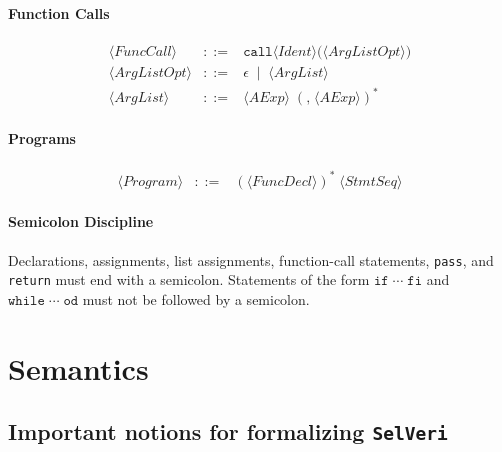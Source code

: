 \documentclass{article}
\begin{document}
\paragraph{Function Calls}
\[
\begin{array}{rcl}
\langle \mathit{FuncCall} \rangle
&::=&
\mathtt{call} \langle \mathit{Ident} \rangle\texttt{(}\langle \mathit{ArgListOpt} \rangle\texttt{)} \\[4pt]

\langle \mathit{ArgListOpt} \rangle
&::=&
\epsilon
\;\mid\;
\langle \mathit{ArgList} \rangle \\[4pt]

\langle \mathit{ArgList} \rangle
&::=&
\langle \mathit{AExp} \rangle\;(\texttt{,}\;\langle \mathit{AExp} \rangle)^*
\end{array}
\]

\paragraph{Programs}
\[
\begin{array}{rcl}
\langle \mathit{Program} \rangle
&::=&
(\langle \mathit{FuncDecl} \rangle)^*\;\langle \mathit{StmtSeq} \rangle
\end{array}
\]

\paragraph{Semicolon Discipline}
Declarations, assignments, list assignments, function-call statements, \texttt{pass}, and \texttt{return}
must end with a semicolon. Statements of the form
\(\mathtt{if}\;\cdots\;\mathtt{fi}\) and
\(\mathtt{while}\;\cdots\;\mathtt{od}\) must not be followed by a semicolon.



\newpage
\section{Semantics}
\vspace{2em}

\subsection{Important notions for formalizing \texttt{SelVeri}}
\vspace{0.5em}
\end{document}
